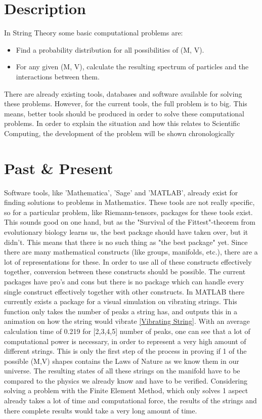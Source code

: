 \documentclass[../paper.tex]{subfiles}
\begin{document}
\section{Description}
In String Theory some basic computational problems are:
\begin{itemize}
    \item Find a probability distribution for all possibilities of (M, V).
    \item For any given (M, V), calculate the resulting spectrum of particles and the interactions between them.
\end{itemize}

There are already existing tools, databases and software available for solving these problems. However, for the current tools, the full problem is to big. This means, better tools should be produced in order to solve these computational problems. In order to explain the situation and how this relates to Scientific Computing, the development of the problem will be shown chronologically

\section{Past \& Present}
Software tools, like 'Mathematica', 'Sage' and 'MATLAB', already exist for finding solutions to problems in Mathematics. These tools are not really specific, so for a particular problem, like Riemann-tensors, packages for these tools exist. This sounds good on one hand, but as the "Survival of the Fittest"-theorem from evolutionary biology learns us, the best package should have taken over, but it didn't. This means that there is no such thing as "the best package" yet. Since there are many mathematical constructs (like groups, manifolds, etc.), there are a lot of representations for these. In order to use all of these constructs effectively together, conversion between these constructs should be possible. The current packages have pro's and cons but there is no package which can handle every single construct effectively together with other constructs. In MATLAB there currently exists a package for a visual simulation on vibrating strings. This function only takes the number of peaks a string has, and outputs this in a animation on how the string would vibrate \ref{Vibrating String}. With an average calculation time of 0.219 for [2,3,4,5] number of peaks, one can see that a lot of computational power is necessary, in order to represent a very high amount of different strings. This is only the first step of the process in proving if 1 of the possible (M,V) shapes contains the Laws of Nature as we know them in our universe. The resulting states of all these strings on the manifold have to be compared to the physics we already know and have to be verified. Considering solving a problem with the Finite Element Method, which only solves 1 aspect already takes a lot of time and computational force, the results of the strings and there complete results would take a very long amount of time.
\end{document}
